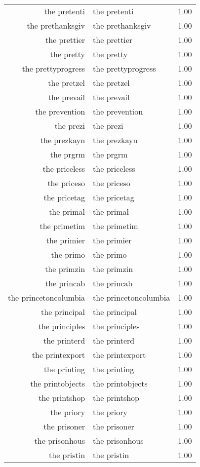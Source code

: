 \begin{table}[ht]
\begin{tabular}{rlr}
  the pretenti & the pretenti & 1.00 \\ 
  the prethanksgiv & the prethanksgiv & 1.00 \\ 
  the prettier & the prettier & 1.00 \\ 
  the pretty & the pretty & 1.00 \\ 
  the prettyprogress & the prettyprogress & 1.00 \\ 
  the pretzel & the pretzel & 1.00 \\ 
  the prevail & the prevail & 1.00 \\ 
  the prevention & the prevention & 1.00 \\ 
  the prezi & the prezi & 1.00 \\ 
  the prezkayn & the prezkayn & 1.00 \\ 
  the prgrm & the prgrm & 1.00 \\ 
  the priceless & the priceless & 1.00 \\ 
  the priceso & the priceso & 1.00 \\ 
  the pricetag & the pricetag & 1.00 \\ 
  the primal & the primal & 1.00 \\ 
  the primetim & the primetim & 1.00 \\ 
  the primier & the primier & 1.00 \\ 
  the primo & the primo & 1.00 \\ 
  the primzin & the primzin & 1.00 \\ 
  the princab & the princab & 1.00 \\ 
  the princetoncolumbia & the princetoncolumbia & 1.00 \\ 
  the principal & the principal & 1.00 \\ 
  the principles & the principles & 1.00 \\ 
  the printerd & the printerd & 1.00 \\ 
  the printexport & the printexport & 1.00 \\ 
  the printing & the printing & 1.00 \\ 
  the printobjects & the printobjects & 1.00 \\ 
  the printshop & the printshop & 1.00 \\ 
  the priory & the priory & 1.00 \\ 
  the prisoner & the prisoner & 1.00 \\ 
  the prisonhous & the prisonhous & 1.00 \\ 
  the pristin & the pristin & 1.00 \\ 

\end{tabular}
\end{table}
